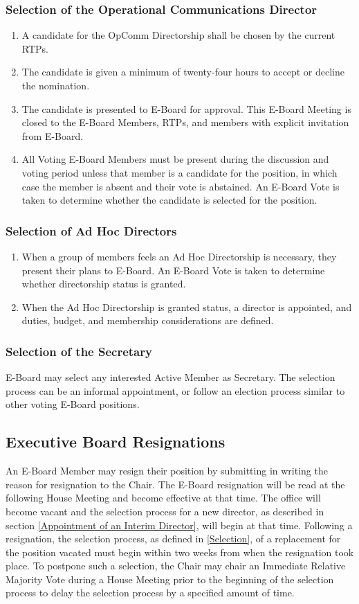 \documentclass{article}
\newcommand{\asection}[1]{\subsection{#1} \label{#1}}
\newcommand{\asubsection}[1]{\subsubsection{#1} \label{#1}}
\begin{document}
\asubsection{Selection of the Operational Communications Director}
\renewcommand{\theenumi}{\alph{enumi}} %

\begin{enumerate}
	\item A candidate for the OpComm Directorship shall be chosen by the current RTPs.
	\item The candidate is given a minimum of twenty-four hours to accept or decline the nomination.
	\item The candidate is presented to E-Board for approval.
	      This E-Board Meeting is closed to the E-Board Members, RTPs, and members with explicit invitation from E-Board.
	\item All Voting E-Board Members must be present during the discussion and voting period unless that member is a candidate for the position, in which case the member is absent and their vote is abstained.
	      An E-Board Vote is taken to determine whether the candidate is selected for the position.
\end{enumerate}

\asubsection{Selection of Ad Hoc Directors}
\begin{enumerate}
	\item When a group of members feels an Ad Hoc Directorship is necessary, they present their plans to E-Board.
	      An E-Board Vote is taken to determine whether directorship status is granted.
	\item When the Ad Hoc Directorship is granted status, a director is appointed, and duties, budget, and membership considerations are defined.
\end{enumerate}

\asubsection{Selection of the Secretary}
E-Board may select any interested Active Member as Secretary.
The selection process can be an informal appointment, or follow an election process similar to other voting E-Board positions.

\asection{Executive Board Resignations}
An E-Board Member may resign their position by submitting in writing the reason for resignation to the Chair.
The E-Board resignation will be read at the following House Meeting and become effective at that time.
The office will become vacant and the selection process for a new director, as described in section \ref{Appointment of an Interim Director}, will begin at that time.
Following a resignation, the selection process, as defined in \ref{Selection}, of a replacement for the position vacated must begin within two weeks from when the resignation took place.
To postpone such a selection, the Chair may chair an Immediate Relative Majority Vote during a House Meeting prior to the beginning of the selection process to delay the selection process by a specified amount of time.
\end{document}
